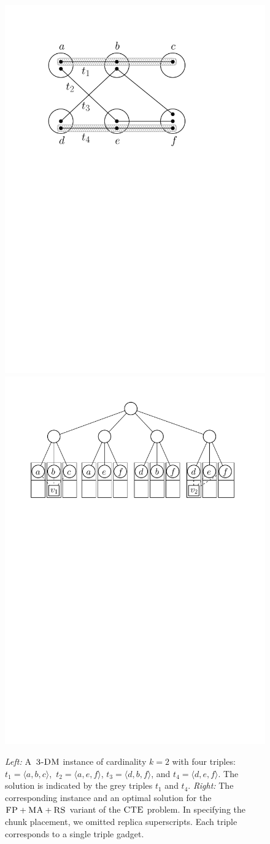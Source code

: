 \begin{figure}[t]
  \centering
\includegraphics[width = 0.31\columnwidth]{figs/static-mapping/tdp-example}
\hspace{1cm}
\centering
\includegraphics[width = 0.55\columnwidth]{figs/static-mapping/cte-ma}
\hfill
\caption{\textit{Left:} A~$\textsc{3-DM}$ instance of cardinality $k=2$ with four triples:
$t_1 = \langle a, b, c \rangle$,~$t_2 = \langle a, e, f \rangle$, $t_3 = \langle d, b, f \rangle$, and $t_4 = \langle d, e, f \rangle$. The solution is
indicated by the grey triples $t_1$ and $t_4$. \textit{Right:} The corresponding instance and an optimal solution for the~$\textsc{FP} + \textsc{MA}
+ \textsc{RS}$ variant of the $\textsc{CTE}$ problem. In specifying the chunk placement, we omitted replica superscripts. Each triple corresponds to a single triple gadget.}
\hfill
\label{fig:fprsma}
\end{figure}

